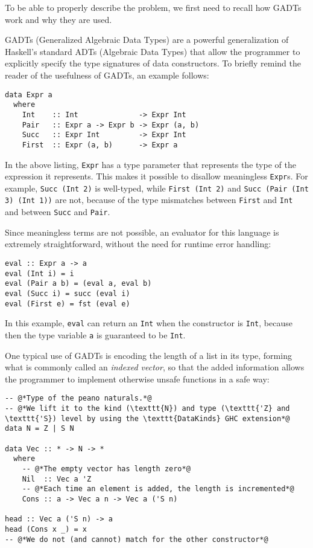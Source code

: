To be able to properly describe the problem, we first need to recall how GADTs work and why they are used.

GADTs (Generalized Algebraic Data Types) are a powerful generalization of Haskell's standard ADTs (Algebraic Data Types) that allow the programmer to explicitly specify the type signatures of data constructors. To briefly remind the reader of the usefulness of GADTs, an example follows:

\begin{lstlisting}[caption=A GADT describing a simple language with ints and pairs]
data Expr a
  where
    Int    :: Int              -> Expr Int
    Pair   :: Expr a -> Expr b -> Expr (a, b)
    Succ   :: Expr Int         -> Expr Int
    First  :: Expr (a, b)      -> Expr a
\end{lstlisting}

In the above listing, \texttt{Expr} has a type parameter that represents the type of the expression it represents.
This makes it possible to disallow meaningless \texttt{Expr}s.
For example, \texttt{Succ (Int 2)} is well-typed, while \texttt{First (Int 2)} and \texttt{Succ (Pair (Int 3) (Int 1))} are not, because of the type mismatches between \texttt{First} and \texttt{Int} and between \texttt{Succ} and \texttt{Pair}.

Since meaningless terms are not possible, an evaluator for this language is extremely straightforward, without the need for runtime error handling:

\begin{lstlisting}[caption=Evaluator for \texttt{Expr}]
eval :: Expr a -> a
eval (Int i) = i
eval (Pair a b) = (eval a, eval b)
eval (Succ i) = succ (eval i)
eval (First e) = fst (eval e)
\end{lstlisting}

In this example, \texttt{eval} can return an \texttt{Int} when the constructor is \texttt{Int}, because then the type variable \texttt{a} is guaranteed to be \texttt{Int}.

One typical use of GADTs is encoding the length of a list in its type, forming what is commonly called an \emph{indexed vector}, so that the added information allows the programmer to implement otherwise unsafe functions in a safe way:

\begin{lstlisting}[caption=A length-indexed vector]
-- @*Type of the peano naturals.*@
-- @*We lift it to the kind (\texttt{N}) and type (\texttt{'Z} and \texttt{'S}) level by using the \texttt{DataKinds} GHC extension*@
data N = Z | S N

data Vec :: * -> N -> *
  where
    -- @*The empty vector has length zero*@
    Nil  :: Vec a 'Z
    -- @*Each time an element is added, the length is incremented*@
    Cons :: a -> Vec a n -> Vec a ('S n)

head :: Vec a ('S n) -> a
head (Cons x _) = x
-- @*We do not (and cannot) match for the other constructor*@
\end{lstlisting}

